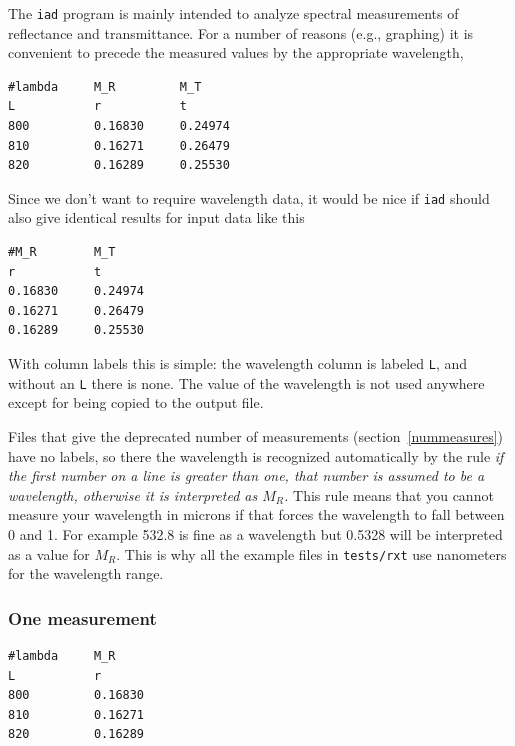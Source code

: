 \documentclass{article}
\newcommand\iadprog{\texttt{iad}}
\begin{document}
The \iadprog{} program is mainly intended to analyze spectral measurements of reflectance
and transmittance.  For a number of reasons (e.g., graphing) it is convenient to 
precede the measured values by the appropriate wavelength,
\begin{center}
\begin{minipage}{5cm}
\scriptsize
\begin{verbatim}
#lambda     M_R         M_T
L           r           t
800         0.16830     0.24974
810         0.16271     0.26479
820         0.16289     0.25530
\end{verbatim}
\end{minipage}
\end{center}
Since we don't want to require wavelength data, it would be nice if \iadprog{} should also give identical results for input data like this
\begin{center}
\begin{minipage}{3cm}
\scriptsize
\begin{verbatim}
#M_R        M_T
r           t
0.16830     0.24974
0.16271     0.26479
0.16289     0.25530
\end{verbatim}
\end{minipage}
\end{center}
With column labels this is simple: the wavelength column is labeled
\texttt{L}, and without an \texttt{L} there is none.
The value of the wavelength is not used anywhere
except for being copied to the output file.

Files that give the deprecated number of measurements (section~\ref{nummeasures})
have no labels, so there the wavelength is recognized automatically by the rule
\textit{if the first
number on a line is greater than one, that number is assumed to be a wavelength,
otherwise it is interpreted as $M_R$.}
This rule means that you cannot measure your wavelength in microns if that forces
the wavelength to fall between 0 and 1.  For example 532.8 is fine as a wavelength
but 0.5328 will be interpreted as a value for $M_R$.  This is why all the example
files in \texttt{tests/rxt} use nanometers for the wavelength range.

\subsubsection{One measurement}

\begin{center}
\begin{minipage}{3cm}
\scriptsize
\begin{verbatim}
#lambda     M_R
L           r
800         0.16830
810         0.16271
820         0.16289
\end{verbatim}
\end{minipage}
\end{center}
\end{document}
